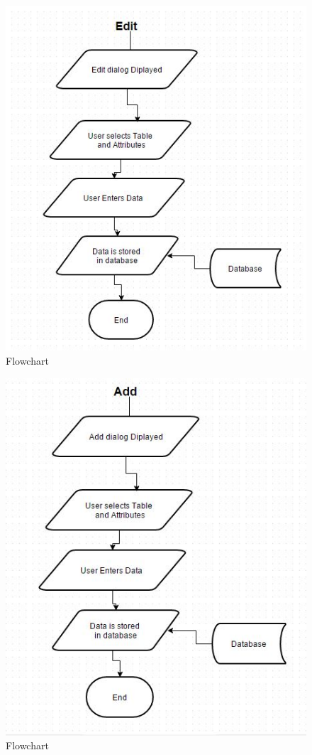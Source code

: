 \begin{figure}[H]
    \includegraphics[width=\textwidth]{DesignAlg4.JPG}
    \caption{Flowchart} \label{fig:Flowchart}
\end{figure}

\begin{figure}[H]
    \includegraphics[width=\textwidth]{DesignAlg5.JPG}
    \caption{Flowchart} \label{fig:Flowchart}
\end{figure}

